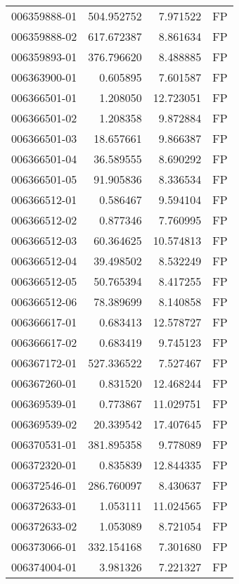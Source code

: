 \begin{tabular}{lrrl}
006359888-01 &  504.952752 &       7.971522 &   FP \\
006359888-02 &  617.672387 &       8.861634 &   FP \\
006359893-01 &  376.796620 &       8.488885 &   FP \\
006363900-01 &    0.605895 &       7.601587 &   FP \\
006366501-01 &    1.208050 &      12.723051 &   FP \\
006366501-02 &    1.208358 &       9.872884 &   FP \\
006366501-03 &   18.657661 &       9.866387 &   FP \\
006366501-04 &   36.589555 &       8.690292 &   FP \\
006366501-05 &   91.905836 &       8.336534 &   FP \\
006366512-01 &    0.586467 &       9.594104 &   FP \\
006366512-02 &    0.877346 &       7.760995 &   FP \\
006366512-03 &   60.364625 &      10.574813 &   FP \\
006366512-04 &   39.498502 &       8.532249 &   FP \\
006366512-05 &   50.765394 &       8.417255 &   FP \\
006366512-06 &   78.389699 &       8.140858 &   FP \\
006366617-01 &    0.683413 &      12.578727 &   FP \\
006366617-02 &    0.683419 &       9.745123 &   FP \\
006367172-01 &  527.336522 &       7.527467 &   FP \\
006367260-01 &    0.831520 &      12.468244 &   FP \\
006369539-01 &    0.773867 &      11.029751 &   FP \\
006369539-02 &   20.339542 &      17.407645 &   FP \\
006370531-01 &  381.895358 &       9.778089 &   FP \\
006372320-01 &    0.835839 &      12.844335 &   FP \\
006372546-01 &  286.760097 &       8.430637 &   FP \\
006372633-01 &    1.053111 &      11.024565 &   FP \\
006372633-02 &    1.053089 &       8.721054 &   FP \\
006373066-01 &  332.154168 &       7.301680 &   FP \\
006374004-01 &    3.981326 &       7.221327 &   FP \\

\end{tabular}
